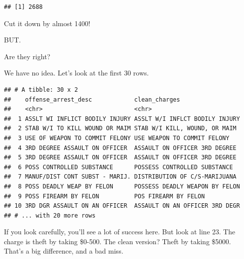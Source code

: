 \documentclass[]{book}
\newenvironment{Shaded}{\begin{snugshade}}{\end{snugshade}}
\newcommand{\DataTypeTok}[1]{\textcolor[rgb]{0.13,0.29,0.53}{#1}}
\newcommand{\DecValTok}[1]{\textcolor[rgb]{0.00,0.00,0.81}{#1}}
\newcommand{\KeywordTok}[1]{\textcolor[rgb]{0.13,0.29,0.53}{\textbf{#1}}}
\newcommand{\NormalTok}[1]{#1}
\newcommand{\OperatorTok}[1]{\textcolor[rgb]{0.81,0.36,0.00}{\textbf{#1}}}
\newcommand{\OtherTok}[1]{\textcolor[rgb]{0.56,0.35,0.01}{#1}}
\newcommand{\StringTok}[1]{\textcolor[rgb]{0.31,0.60,0.02}{#1}}
\begin{document}
\begin{verbatim}
## [1] 2688
\end{verbatim}

Cut it down by almost 1400!

BUT.

Are they right?

We have no idea. Let's look at the first 30 rows.

\begin{Shaded}
\end{Shaded}

\begin{verbatim}
## # A tibble: 30 x 2
##    offense_arrest_desc            clean_charges                 
##    <chr>                          <chr>                         
##  1 ASSLT WI INFLICT BODILY INJURY ASSLT W/I INFLCT BODILY INJURY
##  2 STAB W/I TO KILL WOUND OR MAIM STAB W/I KILL, WOUND, OR MAIM 
##  3 USE OF WEAPON TO COMMIT FELONY USE WEAPON TO COMMIT FELONY   
##  4 3RD DEGREE ASSAULT ON OFFICER  ASSAULT ON OFFICER 3RD DEGREE 
##  5 3RD DEGREE ASSAULT ON OFFICER  ASSAULT ON OFFICER 3RD DEGREE 
##  6 POSS CONTROLLED SUBSTANCE      POSSESS CONTROLLED SUBSTANCE  
##  7 MANUF/DIST CONT SUBST - MARIJ. DISTRIBUTION OF C/S-MARIJUANA 
##  8 POSS DEADLY WEAP BY FELON      POSSESS DEADLY WEAPON BY FELON
##  9 POSS FIREARM BY FELON          POS FIREARM BY FELON          
## 10 3RD DGR ASSAULT ON AN OFFICER  ASSAULT ON AN OFFICER 3RD DEGR
## # ... with 20 more rows
\end{verbatim}

If you look carefully, you'll see a lot of success here. But look at line 23. The charge is theft by taking \$0-500. The clean version? Theft by taking \$5000. That's a big difference, and a bad miss.
\end{document}
